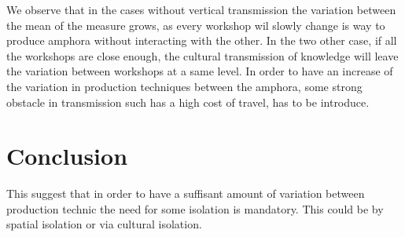 \documentclass[a4paper]{article}
\begin{document}
    We observe that in the cases without vertical transmission the variation between the mean of the measure grows, as every workshop wil slowly change is way to produce amphora without interacting with the other. In the two other case, if all the workshops are close enough, the cultural transmission of knowledge will leave the variation between workshops at a same level. In order to have an increase of the variation in production techniques between the amphora, some strong obstacle in transmission such has a high cost of travel, has to be introduce.


\section{Conclusion}
    
    This suggest that in order to have a suffisant amount of variation between production technic the need for some isolation is mandatory. This could be by spatial isolation or via cultural isolation. 
 


%
%
%
%
\end{document}
